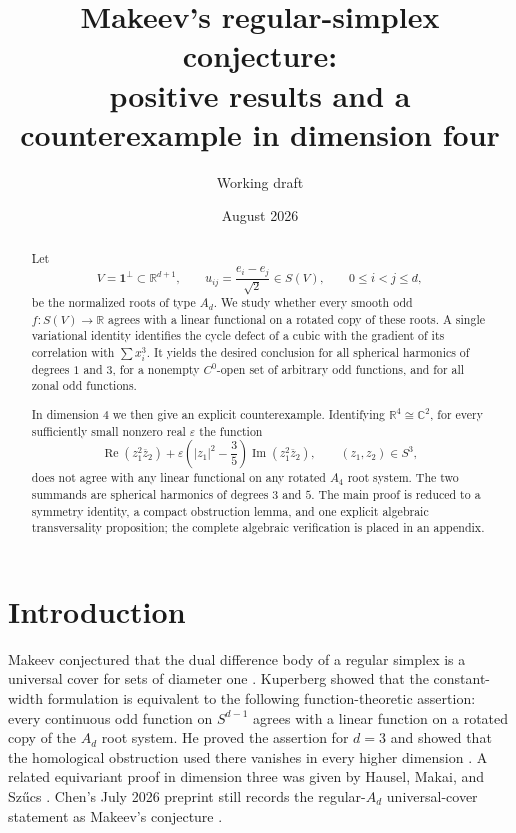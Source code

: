 \documentclass[11pt,reqno]{amsart}
\title[Makeev's conjecture in dimension four]{Makeev's regular-simplex conjecture:\\positive results and a counterexample in dimension four}
\author{Working draft}
\date{August 2026}
\theoremstyle{definition}
\theoremstyle{remark}
\newcommand{\R}{\mathbb R}
\newcommand{\C}{\mathbb C}
\newcommand{\one}{\mathbf 1}
\newcommand{\eps}{\varepsilon}
\newcommand{\abs}[1]{\left\lvert #1\right\rvert}
\begin{document}
\begin{abstract}
Let
\[
V=\one^\perp\subset \R^{d+1},\qquad
u_{ij}=\frac{e_i-e_j}{\sqrt2}\in S(V),\qquad 0\le i<j\le d,
\]
be the normalized roots of type $A_d$.  We study whether every smooth odd
$f\colon S(V)\to\R$ agrees with a linear functional on a rotated copy of these
roots.  A single variational identity identifies the cycle defect of a cubic
with the gradient of its correlation with $\sum x_i^3$.  It yields the desired
conclusion for all spherical harmonics of degrees $1$ and $3$, for a nonempty
$C^0$-open set of arbitrary odd functions, and for all zonal odd functions.

In dimension $4$ we then give an explicit counterexample.  Identifying
$\R^4\cong\C^2$, for every sufficiently small nonzero real $\eps$ the function
\[
\operatorname{Re}(z_1^2\overline z_2)
+\eps\left(\abs{z_1}^2-\frac35\right)
 \operatorname{Im}(z_1^2\overline z_2),\qquad (z_1,z_2)\in S^3,
\]
does not agree with any linear functional on any rotated $A_4$ root system.
The two summands are spherical harmonics of degrees $3$ and $5$.  The main
proof is reduced to a symmetry identity, a compact obstruction lemma, and one
explicit algebraic transversality proposition; the complete algebraic
verification is placed in an appendix.
\end{abstract}

\maketitle

\section{Introduction}

Makeev conjectured that the dual difference body of a regular simplex is a
universal cover for sets of diameter one \cite{Makeev1994}.  Kuperberg showed
that the constant-width formulation is equivalent to the following
function-theoretic assertion: every continuous odd function on $S^{d-1}$
agrees with a linear function on a rotated copy of the $A_d$ root system.  He
proved the assertion for $d=3$ and showed that the homological obstruction used
there vanishes in every higher dimension \cite{Kuperberg1999}.  A related
equivariant proof in dimension three was given by Hausel, Makai, and
Sz\H{u}cs \cite{HauselMakaiSzucs2000}.  Chen's July 2026 preprint still records
the regular-$A_d$ universal-cover statement as Makeev's conjecture
\cite{Chen2026}.
\end{document}
